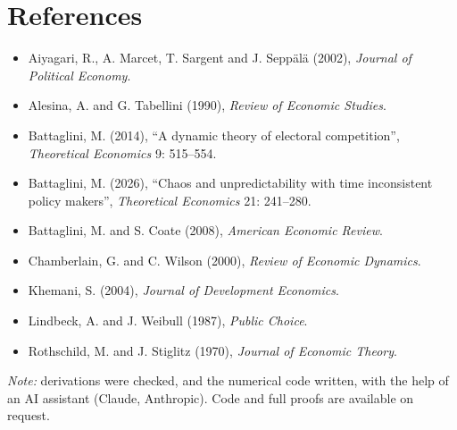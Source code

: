\documentclass[11pt]{article}
\begin{document}
\section*{References}
\small
\begin{itemize}[label={},leftmargin=0pt]
\item Aiyagari, R., A. Marcet, T. Sargent and J. Sepp\"al\"a (2002), \emph{Journal of Political Economy}.
\item Alesina, A. and G. Tabellini (1990), \emph{Review of Economic Studies}.
\item Battaglini, M. (2014), ``A dynamic theory of electoral competition'', \emph{Theoretical Economics} 9: 515--554.
\item Battaglini, M. (2026), ``Chaos and unpredictability with time inconsistent policy makers'', \emph{Theoretical Economics} 21: 241--280.
\item Battaglini, M. and S. Coate (2008), \emph{American Economic Review}.
\item Chamberlain, G. and C. Wilson (2000), \emph{Review of Economic Dynamics}.
\item Khemani, S. (2004), \emph{Journal of Development Economics}.
\item Lindbeck, A. and J. Weibull (1987), \emph{Public Choice}.
\item Rothschild, M. and J. Stiglitz (1970), \emph{Journal of Economic Theory}.
\end{itemize}

\vspace{6pt}
\noindent\emph{Note:} derivations were checked, and the numerical code written, with the help of an AI assistant (Claude, Anthropic). Code and full proofs are available on request.
\end{document}
